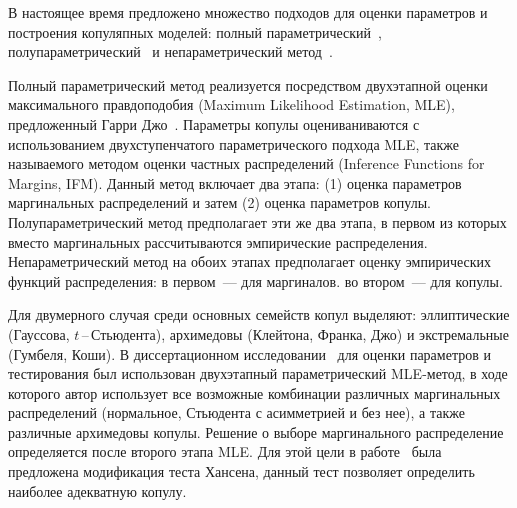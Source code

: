 В настоящее время предложено множество подходов для оценки параметров и построения копуляпных моделей:
полный параметрический~\cite{Patton2006}, полупараметрический~\cite{Chen2006, Lourme2016} и непараметрический метод~\cite{Fermanian2003, Kim2007}.

Полный параметрический метод реализуется посредством двухэтапной оценки максимального правдоподобия (Maximum Likelihood Estimation, MLE), предложенный Гарри Джо~\cite{Joe1997, Joe2014}.
Параметры копулы оцениваниваются с использованием двухступенчатого параметрического подхода MLE, также называемого методом оценки частных распределений (Inference Functions for Margins, IFM). 
Данный метод включает два этапа: (1) оценка параметров маргинальных распределений и затем (2) оценка параметров копулы.
Полупараметрический метод предполагает эти же два этапа, в первом из которых вместо маргинальных рассчитываются эмпирические распределения.
Непараметрический метод на обоих этапах предполагает оценку эмпирических функций распределения: в первом~--- для маргиналов. во втором~--- для копулы.

Для двумерного случая среди основных семейств копул выделяют: эллиптические (Гауссова, $t$\,--\,Стьюдента), архимедовы (Клейтона, Франка, Джо) и экстремальные (Гумбеля, Коши).
В диссертационном исследовании~\cite{Xu2008} для оценки параметров и тестирования был использован двухэтапный параметрический MLE-метод, в ходе которого автор использует все возможные комбинации различных маргинальных распределений (нормальное, Стьюдента с асимметрией и без нее), а также различные архимедовы копулы. 
Решение о выборе маргинального распределение определяется после второго этапа MLE. 
Для этой цели в работе~\cite{Hansen2005} была предложена модификация теста Хансена, данный тест позволяет определить наиболее адекватную копулу.

